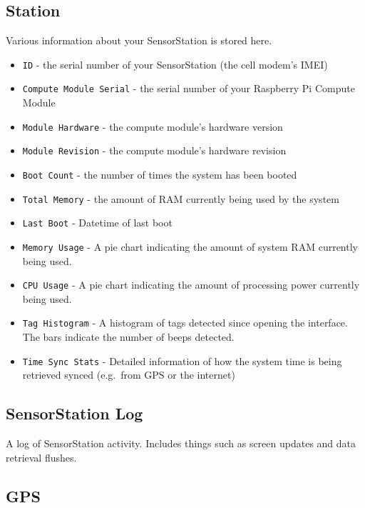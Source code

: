 \documentclass[
]{article}
\begin{document}
\hypertarget{station}{%
\subsection{Station}\label{station}}

Various information about your SensorStation is stored here.

\begin{itemize}
\item
  \texttt{ID} - the serial number of your SensorStation (the cell
  modem's IMEI)
\item
  \texttt{Compute\ Module\ Serial} - the serial number of your Raspberry
  Pi Compute Module
\item
  \texttt{Module\ Hardware} - the compute module's hardware version
\item
  \texttt{Module\ Revision} - the compute module's hardware revision
\item
  \texttt{Boot\ Count} - the number of times the system has been booted
\item
  \texttt{Total\ Memory} - the amount of RAM currently being used by the
  system
\item
  \texttt{Last\ Boot} - Datetime of last boot
\item
  \texttt{Memory\ Usage} - A pie chart indicating the amount of system
  RAM currently being used.
\item
  \texttt{CPU\ Usage} - A pie chart indicating the amount of processing
  power currently being used.
\item
  \texttt{Tag\ Histogram} - A histogram of tags detected since opening
  the interface. The bars indicate the number of beeps detected.
\item
  \texttt{Time\ Sync\ Stats} - Detailed information of how the system
  time is being retrieved synced (e.g.~from GPS or the internet)
\end{itemize}

\hypertarget{sensorstation-log}{%
\subsection{SensorStation Log}\label{sensorstation-log}}

A log of SensorStation activity. Includes things such as screen updates
and data retrieval flushes.

\hypertarget{gps}{%
\subsection{GPS}\label{gps}}
\end{document}
